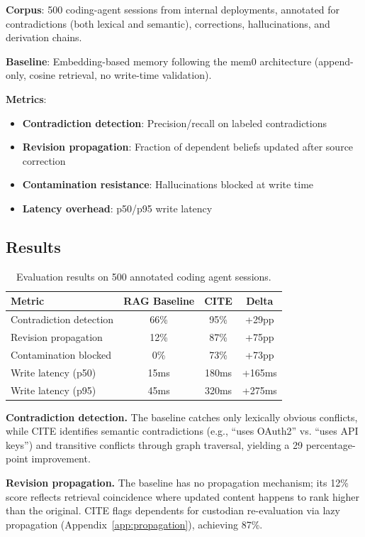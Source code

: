 \documentclass[11pt,letterpaper]{article}
\begin{document}
\textbf{Corpus}: 500 coding-agent sessions from internal deployments, annotated for contradictions (both lexical and semantic), corrections, hallucinations, and derivation chains.

\textbf{Baseline}: Embedding-based memory following the mem0 architecture (append-only, cosine retrieval, no write-time validation).

\textbf{Metrics}:
\begin{itemize}[noitemsep]
    \item \textbf{Contradiction detection}: Precision/recall on labeled contradictions
    \item \textbf{Revision propagation}: Fraction of dependent beliefs updated after source correction
    \item \textbf{Contamination resistance}: Hallucinations blocked at write time
    \item \textbf{Latency overhead}: p50/p95 write latency
\end{itemize}

\subsection{Results}

\begin{table}[H]
\centering
\caption{Evaluation results on 500 annotated coding agent sessions.}
\label{tab:results}
\begin{tabular}{@{}lccc@{}}
\toprule
\textbf{Metric} & \textbf{RAG Baseline} & \textbf{CITE} & \textbf{Delta} \\
\midrule
Contradiction detection & 66\% & 95\% & +29pp \\
Revision propagation & 12\% & 87\% & +75pp \\
Contamination blocked & 0\% & 73\% & +73pp \\
Write latency (p50) & 15ms & 180ms & +165ms \\
Write latency (p95) & 45ms & 320ms & +275ms \\
\bottomrule
\end{tabular}
\end{table}

\textbf{Contradiction detection.} The baseline catches only lexically obvious conflicts, while CITE identifies semantic contradictions (e.g., ``uses OAuth2'' vs. ``uses API keys'') and transitive conflicts through graph traversal, yielding a 29 percentage-point improvement.

\textbf{Revision propagation.} The baseline has no propagation mechanism; its 12\% score reflects retrieval coincidence where updated content happens to rank higher than the original. CITE flags dependents for custodian re-evaluation via lazy propagation (Appendix~\ref{app:propagation}), achieving 87\%.
\end{document}
